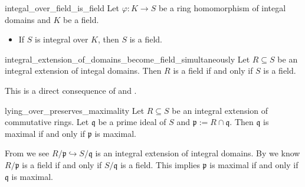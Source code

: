 \begin{proposition}{}{integal_over_field_is_field}
    Let $\varphi:K\to S$ be a ring homomorphism of integal domains and $K$ be a field. 
    \begin{itemize}
        \item If $S$ is integral over $K$, then $S$ is a field.
    \end{itemize}
\end{proposition}

\begin{corollary}{}{integral_extension_of_domains_become_field_simultaneously}
    Let $R\subseteq S$ be an integral extension of integal domains. Then $R$ is a field if and only if $S$ is a field.
\end{corollary}

\begin{prf}
    This is a direct consequence of  and .
\end{prf}

\begin{corollary}{}{lying_over_preserves_maximality}
    Let $R\subseteq S$ be an integral extension of commutative rings. Let $\mathfrak{q}$ be a prime ideal of $S$ and $\mathfrak{p}:=R\cap \mathfrak{q}$. Then  $\mathfrak{q}$ is maximal if and only if $\mathfrak{p}$ is maximal.
\end{corollary}
\begin{prf}
    From  we see $ R/\mathfrak{p}\hookrightarrow S/\mathfrak{q}$ is an integral extension of integral domains. By  we know $R/\mathfrak{p}$ is a field if and only if $S/\mathfrak{q}$ is a field. This implies $\mathfrak{p}$ is maximal if and only if $\mathfrak{q}$ is maximal.
\end{prf}


